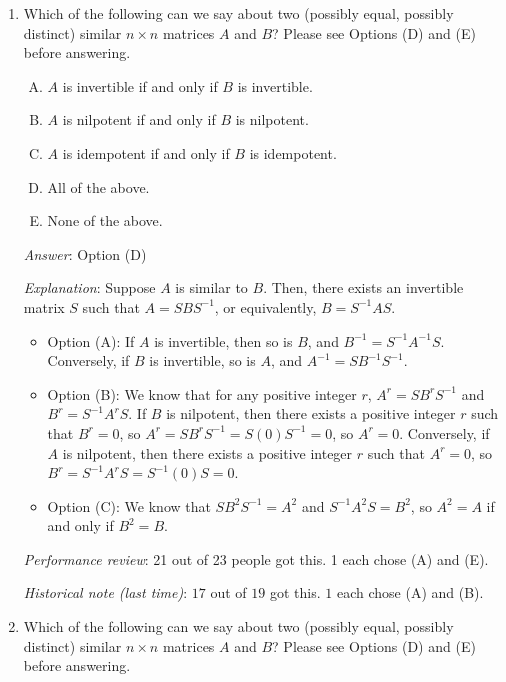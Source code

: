 \documentclass[10pt]{amsart}
\begin{document}
\begin{enumerate}
\item Which of the following can we say about two (possibly equal,
  possibly distinct) similar $n \times n$ matrices $A$ and $B$? Please
  see Options (D) and (E) before answering.

  \begin{enumerate}[(A)]
  \item $A$ is invertible if and only if $B$ is invertible.
  \item $A$ is nilpotent if and only if $B$ is nilpotent.
  \item $A$ is idempotent if and only if $B$ is idempotent.
  \item All of the above.
  \item None of the above.
  \end{enumerate}

  {\em Answer}: Option (D)
 
  {\em Explanation}: Suppose $A$ is similar to $B$. Then, there exists
  an invertible matrix $S$ such that $A = SBS^{-1}$, or equivalently, $B = S^{-1}AS$.

  \begin{itemize}
  \item Option (A): If $A$ is invertible, then so is $B$, and $B^{-1}
    = S^{-1}A^{-1}S$. Conversely, if $B$ is invertible, so is $A$, and
    $A^{-1} = SB^{-1}S^{-1}$.
  \item Option (B): We know that for any positive integer $r$, $A^r =
    SB^rS^{-1}$ and $B^r = S^{-1}A^rS$. If $B$ is nilpotent, then there exists a positive
    integer $r$ such that $B^r = 0$, so $A^r = SB^rS^{-1} = S(0)S^{-1}
    = 0$, so $A^r = 0$. Conversely, if $A$ is nilpotent, then there
    exists a positive integer $r$ such that $A^r = 0$, so $B^r =
    S^{-1}A^rS = S^{-1}(0)S = 0$.
  \item Option (C): We know that $SB^2S^{-1} = A^2$ and $S^{-1}A^2S =
    B^2$, so $A^2 = A$ if and only if $B^2 = B$.
  \end{itemize}

  {\em Performance review}: 21 out of 23 people got this. 1 each chose
  (A) and (E).

  {\em Historical note (last time)}: $17$ out of $19$ got this. $1$ each chose
  (A) and (B).

\item Which of the following can we say about two (possibly equal,
  possibly distinct) similar $n \times n$ matrices $A$ and $B$? Please
  see Options (D) and (E) before answering.


\end{enumerate}
\end{document}
